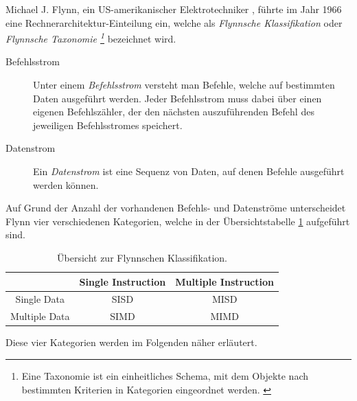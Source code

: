 				Michael J. Flynn, ein US-amerikanischer Elektrotechniker \cite{FlynnWikipedia}, führte im Jahr 1966 eine Rechnerarchitektur-Einteilung ein, welche als \textit{Flynnsche Klassifikation} oder \textit{Flynnsche Taxonomie \footnote{Eine Taxonomie ist ein einheitliches Schema, mit dem Objekte nach bestimmten Kriterien in Kategorien eingeordnet werden. \cite{TaxonomieWikipedia}}} bezeichnet wird.
				
				\begin{description}
					\item [Befehlsstrom]
						Unter einem \textit{Befehlsstrom} versteht man Befehle, welche auf bestimmten Daten ausgeführt werden. Jeder Befehlsstrom muss dabei über einen eigenen Befehlszähler, der den nächsten auszuführenden Befehl des jeweiligen Befehlsstromes speichert. \cite{FlynnsTaxonomie}
					\item [Datenstrom]
						Ein \textit{Datenstrom} ist eine Sequenz von Daten, auf denen Befehle ausgeführt werden können. \cite{FlynnsTaxonomie}
				\end{description}
			
				Auf Grund der Anzahl der vorhandenen Befehls- und Datenströme unterscheidet Flynn vier verschiedenen Kategorien, welche in der Übersichtstabelle \ref{tab:UebersichtFlynnscheKlassifikation} aufgeführt sind.
				
				\begin{table}
					\caption{Übersicht zur Flynnschen Klassifikation.}
					\begin{tabular}{c|c|c}
						& Single Instruction & Multiple Instruction \\
						\hline
						Single Data & SISD & MISD \\
						Multiple Data & SIMD & MIMD \\
					\end{tabular}
					\label{tab:UebersichtFlynnscheKlassifikation}
				\end{table}
			
				Diese vier Kategorien werden im Folgenden näher erläutert.
			
